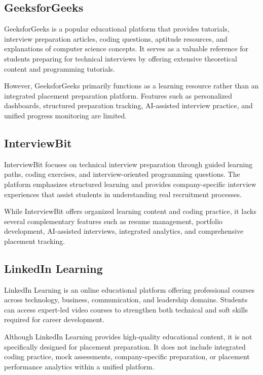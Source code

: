 \subsection{GeeksforGeeks}

GeeksforGeeks is a popular educational platform that provides tutorials, interview preparation articles, coding questions, aptitude resources, and explanations of computer science concepts. It serves as a valuable reference for students preparing for technical interviews by offering extensive theoretical content and programming tutorials.

However, GeeksforGeeks primarily functions as a learning resource rather than an integrated placement preparation platform. Features such as personalized dashboards, structured preparation tracking, AI-assisted interview practice, and unified progress monitoring are limited.

\subsection{InterviewBit}

InterviewBit focuses on technical interview preparation through guided learning paths, coding exercises, and interview-oriented programming questions. The platform emphasizes structured learning and provides company-specific interview experiences that assist students in understanding real recruitment processes.

While InterviewBit offers organized learning content and coding practice, it lacks several complementary features such as resume management, portfolio development, AI-assisted interviews, integrated analytics, and comprehensive placement tracking.

\subsection{LinkedIn Learning}

LinkedIn Learning is an online educational platform offering professional courses across technology, business, communication, and leadership domains. Students can access expert-led video courses to strengthen both technical and soft skills required for career development.

Although LinkedIn Learning provides high-quality educational content, it is not specifically designed for placement preparation. It does not include integrated coding practice, mock assessments, company-specific preparation, or placement performance analytics within a unified platform.

